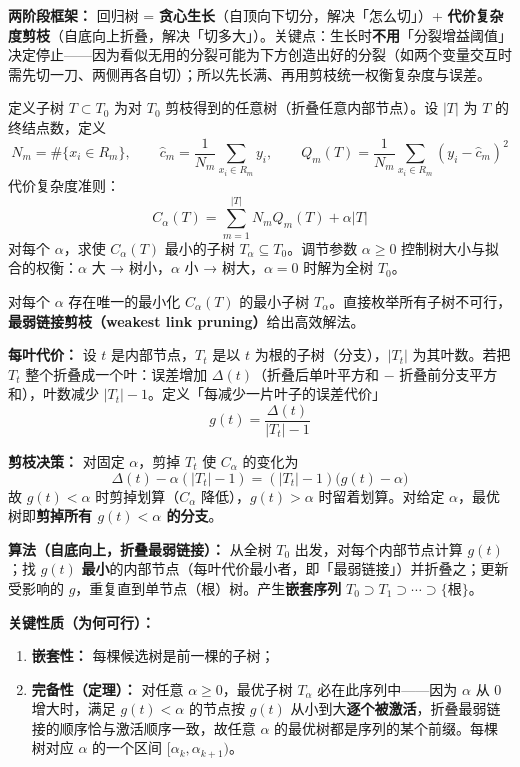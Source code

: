 \textbf{两阶段框架：} 回归树 = \textbf{贪心生长}（自顶向下切分，解决「怎么切」）+ \textbf{代价复杂度剪枝}（自底向上折叠，解决「切多大」）。关键点：生长时\textbf{不用}「分裂增益阈值」决定停止——因为看似无用的分裂可能为下方创造出好的分裂（如两个变量交互时需先切一刀、两侧再各自切）；所以先长满、再用剪枝统一权衡复杂度与误差。

定义子树 $T \subset T_0$ 为对 $T_0$ 剪枝得到的任意树（折叠任意内部节点）。设 $|T|$ 为 $T$ 的终结点数，定义
\begin{equation}\label{eq:9_15}
    N_m = \#\{x_i \in R_m\},\qquad \hat c_m = \frac{1}{N_m}\sum_{x_i \in R_m} y_i,\qquad Q_m(T) = \frac{1}{N_m}\sum_{x_i \in R_m}(y_i - \hat c_m)^2
\end{equation}
代价复杂度准则：
\begin{equation}\label{eq:9_16}
    C_\alpha(T) = \sum_{m=1}^{|T|} N_m Q_m(T) + \alpha |T|
\end{equation}
对每个 $\alpha$，求使 $C_\alpha(T)$ 最小的子树 $T_\alpha \subseteq T_0$。调节参数 $\alpha \ge 0$ 控制树大小与拟合的权衡：$\alpha$ 大 → 树小，$\alpha$ 小 → 树大，$\alpha = 0$ 时解为全树 $T_0$。

对每个 $\alpha$ 存在唯一的最小化 $C_\alpha(T)$ 的最小子树 $T_\alpha$。直接枚举所有子树不可行，\textbf{最弱链接剪枝（weakest link pruning）}给出高效解法。

\textbf{每叶代价：} 设 $t$ 是内部节点，$T_t$ 是以 $t$ 为根的子树（分支），$|T_t|$ 为其叶数。若把 $T_t$ 整个折叠成一个叶：误差增加 $\Delta(t)$（折叠后单叶平方和 $-$ 折叠前分支平方和），叶数减少 $|T_t| - 1$。定义「每减少一片叶子的误差代价」
\[
    g(t) = \frac{\Delta(t)}{|T_t| - 1}
\]

\textbf{剪枝决策：} 对固定 $\alpha$，剪掉 $T_t$ 使 $C_\alpha$ 的变化为
\[
    \Delta(t) - \alpha(|T_t| - 1) = (|T_t| - 1)\bigl(g(t) - \alpha\bigr)
\]
故 $g(t) < \alpha$ 时剪掉划算（$C_\alpha$ 降低），$g(t) > \alpha$ 时留着划算。对给定 $\alpha$，最优树即\textbf{剪掉所有 $g(t) < \alpha$ 的分支}。

\textbf{算法（自底向上，折叠最弱链接）：} 从全树 $T_0$ 出发，对每个内部节点计算 $g(t)$；找 $g(t)$ \textbf{最小}的内部节点（每叶代价最小者，即「最弱链接」）并折叠之；更新受影响的 $g$，重复直到单节点（根）树。产生\textbf{嵌套序列} $T_0 \supset T_1 \supset \cdots \supset \{\text{根}\}$。

\textbf{关键性质（为何可行）：}
\begin{enumerate}
    \item \textbf{嵌套性：} 每棵候选树是前一棵的子树；
    \item \textbf{完备性（定理）：} 对任意 $\alpha \ge 0$，最优子树 $T_\alpha$ 必在此序列中——因为 $\alpha$ 从 $0$ 增大时，满足 $g(t) < \alpha$ 的节点按 $g(t)$ 从小到大\textbf{逐个被激活}，折叠最弱链接的顺序恰与激活顺序一致，故任意 $\alpha$ 的最优树都是序列的某个前缀。每棵树对应 $\alpha$ 的一个区间 $[\alpha_k, \alpha_{k+1})$。
\end{enumerate}

